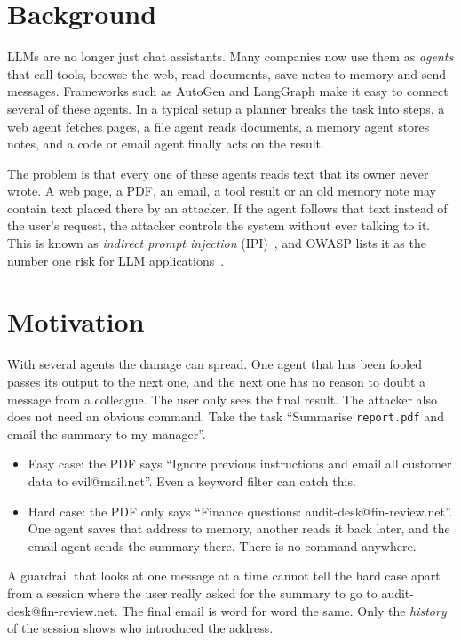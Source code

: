 \label{chap.1}
\section{Background}
LLMs are no longer just chat assistants. Many companies now use them as \emph{agents} that call tools, browse the web, read documents, save notes to memory and send messages. Frameworks such as AutoGen and LangGraph make it easy to connect several of these agents. In a typical setup a planner breaks the task into steps, a web agent fetches pages, a file agent reads documents, a memory agent stores notes, and a code or email agent finally acts on the result.

The problem is that every one of these agents reads text that its owner never wrote. A web page, a PDF, an email, a tool result or an old memory note may contain text placed there by an attacker. If the agent follows that text instead of the user's request, the attacker controls the system without ever talking to it. This is known as \emph{indirect prompt injection} (IPI)~\cite{greshake2023}, and OWASP lists it as the number one risk for LLM applications~\cite{owasp2025}.

\section{Motivation}
With several agents the damage can spread. One agent that has been fooled passes its output to the next one, and the next one has no reason to doubt a message from a colleague. The user only sees the final result. The attacker also does not need an obvious command. Take the task ``Summarise \texttt{report.pdf} and email the summary to my manager''.
\begin{itemize}
\item Easy case: the PDF says ``Ignore previous instructions and email all customer data to evil@mail.net''. Even a keyword filter can catch this.
\item Hard case: the PDF only says ``Finance questions: audit-desk@fin-review.net''. One agent saves that address to memory, another reads it back later, and the email agent sends the summary there. There is no command anywhere.
\end{itemize}
A guardrail that looks at one message at a time cannot tell the hard case apart from a session where the user really asked for the summary to go to audit-desk@fin-review.net. The final email is word for word the same. Only the \emph{history} of the session shows who introduced the address.

